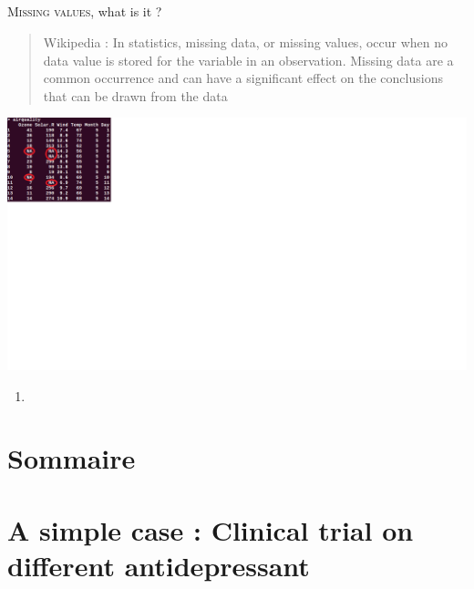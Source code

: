 \documentclass{beamer}
\begin{document}
\subsection[Definition of nissing value]{}
\begin{frame}
  \textsc{Missing values}, what is it ?
  \begin{quote}
  Wikipedia : In statistics, missing data, or missing values, occur when no data value is stored for the variable in an observation. Missing data are a common occurrence and can have a significant effect on the conclusions that can be drawn from the data
  \end{quote}
  \includegraphics[width=25cm]{images/image_missingvalues.png}
\end{frame}

\begin{frame}
  \begin{enumerate}
      \item<1- | alert@1> 
  \end{enumerate}

  
\end{frame}

\section*{Sommaire}
	\begin{frame}
		  \tableofcontents[]
	\end{frame}      

\section[A simple case]{A simple case : Clinical trial on different antidepressant}
\end{document}

